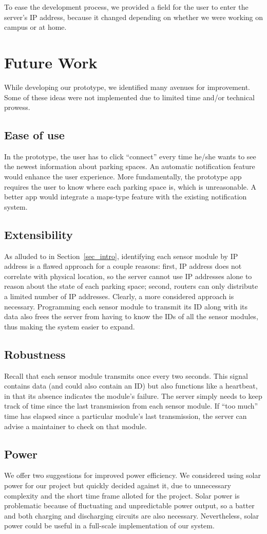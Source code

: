 \documentclass[conference]{IEEEtran}
\begin{document}
To ease the development process, we provided a field for the user to enter the server's IP address, because it changed depending on whether we were working on campus or at home.

\section{Future Work}\label{sec_futurework}
While developing our prototype, we identified many avenues for improvement. Some of these ideas were not implemented due to limited time and/or technical prowess.
\subsection{Ease of use}
In the prototype, the user has to click ``connect'' every time he/she wants to see the newest information about parking spaces. An automatic notification feature would enhance the user experience. More fundamentally, the prototype app requires the user to know where each parking space is, which is unreasonable. A better app would integrate a maps-type feature with the existing notification system.
\subsection{Extensibility}
As alluded to in Section~\ref{sec_intro}, identifying each sensor module by IP address is a flawed approach for a couple reasons: first, IP address does not correlate with physical location, so the server cannot use IP addresses alone to reason about the state of each parking space; second, routers can only distribute a limited number of IP addresses. Clearly, a more considered approach is necessary. Programming each sensor module to transmit its ID along with its data also frees the server from having to know the IDs of all the sensor modules, thus making the system easier to expand.
\subsection{Robustness}
Recall that each sensor module transmits once every two seconds. This signal contains data (and could also contain an ID) but also functions like a heartbeat, in that its absence indicates the module's failure. The server simply needs to keep track of time since the last transmission from each sensor module. If ``too much'' time has elapsed since a particular module's last transmission, the server can advise a maintainer to check on that module.
\subsection{Power}
We offer two suggestions for improved power efficiency. We considered using solar power for our project but quickly decided against it, due to unnecessary complexity and the short time frame alloted for the project. Solar power is problematic because of fluctuating and unpredictable power output, so a batter and both charging and discharging circuits are also necessary. Nevertheless, solar power could be useful in a full-scale implementation of our system.
\end{document}
